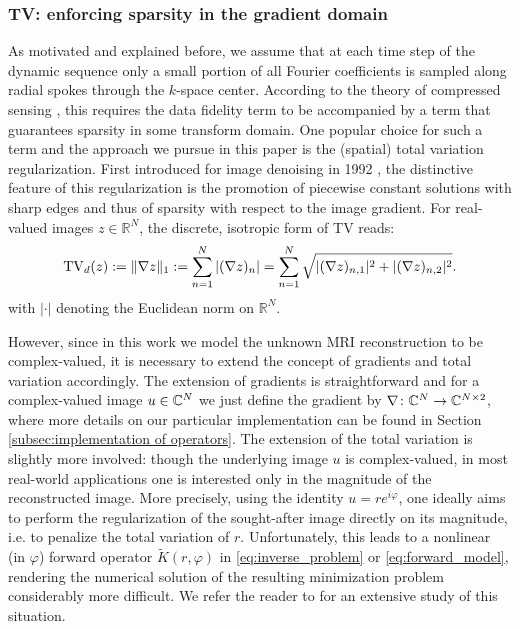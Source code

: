 \subsubsection{TV: enforcing sparsity in the gradient domain}
\label{subsubsec:TV} 
As motivated and explained before, we assume that at each time step of the dynamic sequence only a small portion of all Fourier coefficients is sampled along radial spokes through the $k$-space center. 
According to the theory of compressed sensing \cite{Candes:Robust,Donoho:CompressedSensing,Lustig:Sparse,Huang:CSinMR}, this requires the data fidelity term to be accompanied by a term that guarantees sparsity in some transform domain.
One popular choice for such a term and the approach we pursue in this paper is the (spatial) total variation regularization.  
First introduced for image denoising in 1992 \cite{Rudin:ROF}, the distinctive feature of this regularization is the promotion of piecewise constant solutions with sharp edges and thus of sparsity with respect to the image gradient. 
For real-valued images $z \in \mathbb{R}^N$, the discrete, isotropic form of TV reads:
\begin{align*}
	\mathrm{TV}_d (z) := \| \nabla z \|_1 :=\sum_{n=1}^N |(\nabla z)_n | = \sum_{n=1}^N \sqrt{|(\nabla z)_{n,1}|^2 + |(\nabla z)_{n,2}|^2}.
\end{align*}
with $| \cdot |$ denoting the Euclidean norm on $\mathbb{R}^N$.

However, since in this work we model the unknown MRI reconstruction to be complex-valued, it is necessary to extend the concept of gradients and total variation accordingly. 
The extension of gradients is straightforward and for a complex-valued image $u \in \mathbb{C}^N$ we just define the gradient by $\nabla \colon \mathbb{C}^N \to \mathbb{C}^{N \times 2}$, where more details on our particular implementation can be found in Section \ref{subsec:implementation of operators}. 
The extension of the total variation is slightly more involved: 
though the underlying image $u$ is complex-valued, in most real-world applications one is interested only in the magnitude of the reconstructed image. 
More precisely, using the identity $u = r e^{i \varphi}$, one ideally aims to perform the regularization of the sought-after image directly on its magnitude, i.e. to penalize the total variation of $r$. 
Unfortunately, this leads to a nonlinear (in $\varphi$) forward operator $\tilde{K} (r,\varphi)$ in \eqref{eq:inverse_problem} or \eqref{eq:forward_model}, rendering the numerical solution of the resulting minimization problem considerably more difficult.   
We refer the reader to \cite{Valkonen2014} for an extensive study of this situation.

